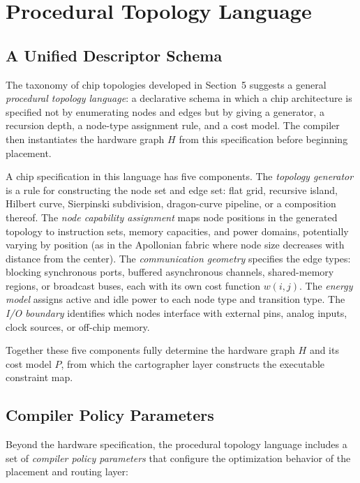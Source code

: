 \documentclass[11pt, a4paper]{article}
\begin{document}
\section{Procedural Topology Language}

\subsection{A Unified Descriptor Schema}

The taxonomy of chip topologies developed in Section~5 suggests a general
\emph{procedural topology language}: a declarative schema in which a chip
architecture is specified not by enumerating nodes and edges but by giving
a generator, a recursion depth, a node-type assignment rule, and a cost model.
The compiler then instantiates the hardware graph $H$ from this specification
before beginning placement.

A chip specification in this language has five components. The \emph{topology
generator} is a rule for constructing the node set and edge set: flat grid,
recursive island, Hilbert curve, Sierpinski subdivision, dragon-curve pipeline,
or a composition thereof. The \emph{node capability assignment} maps node
positions in the generated topology to instruction sets, memory capacities, and
power domains, potentially varying by position (as in the Apollonian fabric where
node size decreases with distance from the center). The \emph{communication
geometry} specifies the edge types: blocking synchronous ports, buffered
asynchronous channels, shared-memory regions, or broadcast buses, each with
its own cost function $w(i,j)$. The \emph{energy model} assigns active and
idle power to each node type and transition type. The \emph{I/O boundary}
identifies which nodes interface with external pins, analog inputs, clock
sources, or off-chip memory.

Together these five components fully determine the hardware graph $H$ and its
cost model $P$, from which the cartographer layer constructs the executable
constraint map.

\subsection{Compiler Policy Parameters}

Beyond the hardware specification, the procedural topology language includes
a set of \emph{compiler policy parameters} that configure the optimization
behavior of the placement and routing layer:
\end{document}
